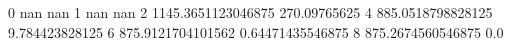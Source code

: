0 nan nan
1 nan nan
2 1145.3651123046875 270.09765625
4 885.0518798828125 9.784423828125
6 875.9121704101562 0.64471435546875
8 875.2674560546875 0.0
